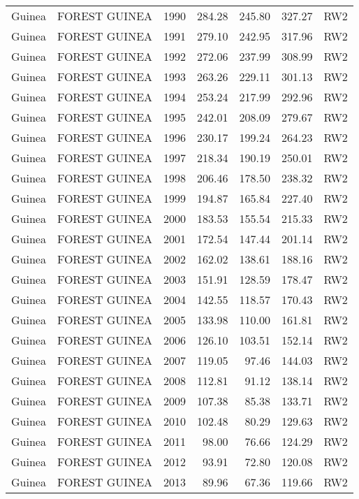 \begin{longtable}{lllrrrl}
  Guinea & FOREST GUINEA & 1990 & 284.28 & 245.80 & 327.27 & RW2 \\ 
  Guinea & FOREST GUINEA & 1991 & 279.10 & 242.95 & 317.96 & RW2 \\ 
  Guinea & FOREST GUINEA & 1992 & 272.06 & 237.99 & 308.99 & RW2 \\ 
  Guinea & FOREST GUINEA & 1993 & 263.26 & 229.11 & 301.13 & RW2 \\ 
  Guinea & FOREST GUINEA & 1994 & 253.24 & 217.99 & 292.96 & RW2 \\ 
  Guinea & FOREST GUINEA & 1995 & 242.01 & 208.09 & 279.67 & RW2 \\ 
  Guinea & FOREST GUINEA & 1996 & 230.17 & 199.24 & 264.23 & RW2 \\ 
  Guinea & FOREST GUINEA & 1997 & 218.34 & 190.19 & 250.01 & RW2 \\ 
  Guinea & FOREST GUINEA & 1998 & 206.46 & 178.50 & 238.32 & RW2 \\ 
  Guinea & FOREST GUINEA & 1999 & 194.87 & 165.84 & 227.40 & RW2 \\ 
  Guinea & FOREST GUINEA & 2000 & 183.53 & 155.54 & 215.33 & RW2 \\ 
  Guinea & FOREST GUINEA & 2001 & 172.54 & 147.44 & 201.14 & RW2 \\ 
  Guinea & FOREST GUINEA & 2002 & 162.02 & 138.61 & 188.16 & RW2 \\ 
  Guinea & FOREST GUINEA & 2003 & 151.91 & 128.59 & 178.47 & RW2 \\ 
  Guinea & FOREST GUINEA & 2004 & 142.55 & 118.57 & 170.43 & RW2 \\ 
  Guinea & FOREST GUINEA & 2005 & 133.98 & 110.00 & 161.81 & RW2 \\ 
  Guinea & FOREST GUINEA & 2006 & 126.10 & 103.51 & 152.14 & RW2 \\ 
  Guinea & FOREST GUINEA & 2007 & 119.05 & 97.46 & 144.03 & RW2 \\ 
  Guinea & FOREST GUINEA & 2008 & 112.81 & 91.12 & 138.14 & RW2 \\ 
  Guinea & FOREST GUINEA & 2009 & 107.38 & 85.38 & 133.71 & RW2 \\ 
  Guinea & FOREST GUINEA & 2010 & 102.48 & 80.29 & 129.63 & RW2 \\ 
  Guinea & FOREST GUINEA & 2011 & 98.00 & 76.66 & 124.29 & RW2 \\ 
  Guinea & FOREST GUINEA & 2012 & 93.91 & 72.80 & 120.08 & RW2 \\ 
  Guinea & FOREST GUINEA & 2013 & 89.96 & 67.36 & 119.66 & RW2 \\ 

\end{longtable}
